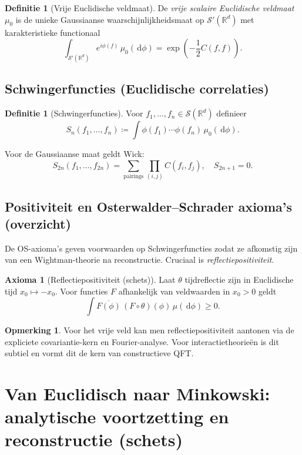 \documentclass[11pt,a4paper,oneside]{book}
\theoremstyle{plain}
\theoremstyle{definition}
\newtheorem{definition}[theorem]{Definitie}
\newtheorem{axiom}[theorem]{Axioma}
\newtheorem{remark}[theorem]{Opmerking}
\newcommand{\R}{\mathbb{R}}
\renewcommand{\dd}{\,\mathrm{d}}
\newcommand{\cS}{\mathcal{S}}
\begin{document}
	\begin{definition}[Vrije Euclidische veldmaat]
		De \emph{vrije scalaire Euclidische veldmaat} $\mu_0$ is de unieke Gaussiaanse waarschijnlijkheidsmaat op $\cS'(\R^d)$
		met karakteristieke functionaal
		\[
		\int_{\cS'(\R^d)} e^{i\phi(f)}\,\mu_0(\dd\phi)
		= \exp\left(-\frac12 C(f,f)\right).
		\]
	\end{definition}
	
	\section{Schwingerfuncties (Euclidische correlaties)}
	\begin{definition}[Schwingerfuncties]
		Voor $f_1,\dots,f_n\in\cS(\R^d)$ definieer
		\[
		S_n(f_1,\dots,f_n)\coloneqq \int \phi(f_1)\cdots \phi(f_n)\,\mu_0(\dd\phi).
		\]
	\end{definition}
	
	Voor de Gaussiaanse maat geldt Wick:
	\[
	S_{2n}(f_1,\dots,f_{2n})
	= \sum_{\text{pairings}} \prod_{(i,j)} C(f_i,f_j),
	\quad S_{2n+1}=0.
	\]
	
	\section{Positiviteit en Osterwalder--Schrader axioma’s (overzicht)}
	De OS-axioma’s geven voorwaarden op Schwingerfuncties zodat ze afkomstig zijn van een Wightman-theorie na reconstructie.
	Cruciaal is \emph{reflectiepositiviteit}.
	
	\begin{axiom}[Reflectiepositiviteit (schets)]
		Laat $\theta$ tijdreflectie zijn in Euclidische tijd $x_0\mapsto -x_0$. Voor functies $F$ afhankelijk van veldwaarden in $x_0>0$
		geldt
		\[
		\int \overline{F(\phi)}\, (F\circ \theta)(\phi)\,\mu(\dd\phi)\ge 0.
		\]
	\end{axiom}
	
	\begin{remark}
		Voor het vrije veld kan men reflectiepositiviteit aantonen via de expliciete covariantie-kern en Fourier-analyse.
		Voor interactietheorieën is dit subtiel en vormt dit de kern van constructieve QFT.
	\end{remark}
	
	\chapter{Van Euclidisch naar Minkowski: analytische voortzetting en reconstructie (schets)}
	
\end{document}

